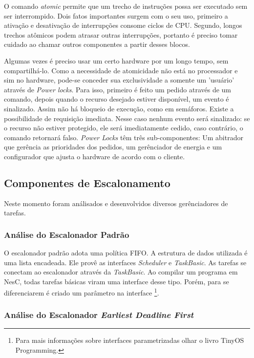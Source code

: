 \documentclass[a4paper,onecolumn, 10pt]{article}
\begin{document}
O comando \textit{atomic} permite que um trecho de instruções possa ser executado sem ser interrompido. Dois fatos
importantes surgem com o seu uso, primeiro a ativação e desativação de interrupções consome ciclos de CPU. Segundo,
longos trechos atômicos podem atrasar outras interrupções, portanto é preciso tomar cuidado ao chamar outros componentes
a partir desses blocos.

Algumas vezes é preciso usar um certo hardware por um longo tempo, sem compartilhá-lo. Como a necessidade de atomicidade
não está no processador e sim no hardware, pode-se conceder sua exclusividade a somente um 'usuário' através de
\textit{Power locks}. Para isso, primeiro é feito um pedido através de um comando, depois quando o recurso desejado
estiver disponível, um evento é sinalizado. Assim não há bloqueio de execução, como em semáforos. Existe a possibilidade
de requisição imediata. Nesse caso nenhum evento será sinalizado: se o recurso não estiver protegido, ele será
imediatamente cedido, caso contrário, o comando retornará falso. \textit{Power Locks} têm três sub-componentes: Um
abitrador que gerência as prioridades dos pedidos, um gerênciador de energia e um configurador que ajusta o hardware de
acordo com o cliente.

\subsection{Componentes de Escalonamento}
Neste momento foram análisados e desenvolvidos diversos gerênciadores de tarefas.

\subsubsection{Análise do Escalonador Padrão}

O escalonador padrão adota uma política FIFO. A estrutura de dados utilizada é uma lista encadeada.
Ele provê as interfaces \textit{Scheduler} e \textit{TaskBasic}.
As tarefas se conectam ao escalonador através da \textit{TaskBasic}. Ao compilar um programa em NesC, todas tarefas
básicas viram uma interface desse tipo. Porém, para se diferenciarem é criado um parâmetro na interface
\footnote{Para mais informações sobre interfaces parametrizadas olhar o livro TinyOS Programming\cite[s. 8.3 e 9]{tinyosprogramming}.}.

\subsubsection{Análise do Escalonador \textit{Earliest Deadline First}}\label{escalonadoredf}
\end{document}
